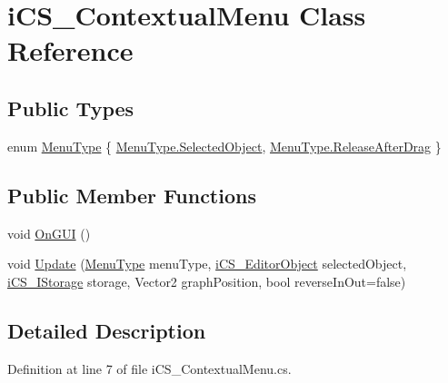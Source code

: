 \hypertarget{classi_c_s___contextual_menu}{\section{i\+C\+S\+\_\+\+Contextual\+Menu Class Reference}
\label{classi_c_s___contextual_menu}
}
\subsection*{Public Types}
\begin{DoxyCompactItemize}
\item 
enum \hyperlink{classi_c_s___contextual_menu_aad81900f7183da154cf44894fc71bf65}{Menu\+Type} \{ \hyperlink{classi_c_s___contextual_menu_aad81900f7183da154cf44894fc71bf65a7301c1095794f6c83bcdb8adcbe38aa5}{Menu\+Type.\+Selected\+Object}, 
\hyperlink{classi_c_s___contextual_menu_aad81900f7183da154cf44894fc71bf65ae88c0c205764785d81552bff12ae22b8}{Menu\+Type.\+Release\+After\+Drag}
 \}
\end{DoxyCompactItemize}
\subsection*{Public Member Functions}
\begin{DoxyCompactItemize}
\item 
void \hyperlink{classi_c_s___contextual_menu_af0feedab4ad112a6875168e472c9e5be}{On\+G\+U\+I} ()
\item 
void \hyperlink{classi_c_s___contextual_menu_a771f656c049700026e2780d57a096ada}{Update} (\hyperlink{classi_c_s___contextual_menu_aad81900f7183da154cf44894fc71bf65}{Menu\+Type} menu\+Type, \hyperlink{classi_c_s___editor_object}{i\+C\+S\+\_\+\+Editor\+Object} selected\+Object, \hyperlink{classi_c_s___i_storage}{i\+C\+S\+\_\+\+I\+Storage} storage, Vector2 graph\+Position, bool reverse\+In\+Out=false)
\end{DoxyCompactItemize}


\subsection{Detailed Description}


Definition at line 7 of file i\+C\+S\+\_\+\+Contextual\+Menu.\+cs.




